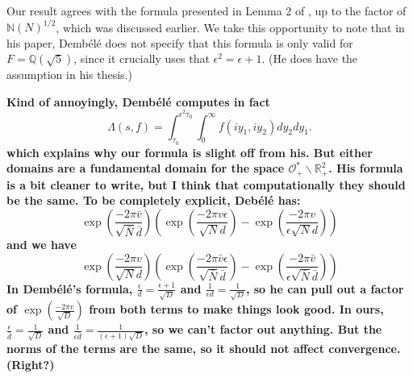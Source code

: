 \documentclass{article}
\theoremstyle{plain}
\begin{document}
Our result agrees with the formula presented in Lemma 2 of \cite{dembele}, up to the factor of $\mathbb{N}(N)^{1/2}$, which was discussed earlier. We take this opportunity to note that in his paper, Demb\'{e}l\'{e} does not specify that this formula is only valid for $F=\mathbb{Q}(\sqrt{5})$, since it crucially uses that $\epsilon^2=\epsilon+1$. (He does have the assumption in his thesis.)

\textbf{Kind of annoyingly, Demb\'{e}l\'{e} computes in fact
\begin{equation*}
\Lambda(s,f)= \int_{\tau_0}^{\epsilon^2 \tau_0}\int_{0}^{\infty} f\left(iy_1,iy_2\right)  dy_2 dy_1.
\end{equation*}
which explains why our formula is slight off from his. But either domains are a fundamental domain for the space $\mathcal{O}_+^*\backslash \mathbb{R}^2_+$. His formula is a bit cleaner to write, but I think that computationally they should be the same. To be completely explicit, Deb\'{e}l\'{e} has:
\begin{equation*}
\exp\left( \frac{-2\pi\bar{v}}{\sqrt{\bar{N}}\bar{d}}\right) \left(\exp\left(\frac{-2 \pi v \epsilon}{\sqrt{N} d}\right) - \exp \left( \frac{-2\pi v}{\epsilon \sqrt{N}d}\right) \right)
\end{equation*}
and we have
\begin{equation*}
\exp\left( \frac{-2\pi v}{\sqrt{N}d}\right) \left(\exp\left(\frac{-2 \pi \bar{v} \epsilon}{\sqrt{\bar{N}} \bar{d}}\right) - \exp \left( \frac{-2\pi \bar{v}}{\epsilon \sqrt{\bar{N}}\bar{d}}\right) \right)
\end{equation*}
In Demb\'{e}l\'{e}'s formula, $\frac{\epsilon}{d}=\frac{\epsilon+1}{\sqrt{D}}$ and $\frac{1}{\epsilon d}=\frac{1}{\sqrt{D}}$, so he can pull out a factor of $\exp\left(\frac{-2 \pi v}{\sqrt{D}}\right)$ from both terms to make things look good. In ours, $\frac{\epsilon}{\bar{d}}=\frac{1}{\sqrt{D}}$ and $\frac{1}{\epsilon \bar{d}}=\frac{1}{(\epsilon+1) \sqrt{D}}$, so we can't factor out anything. But the norms of the terms are the same, so it should not affect convergence. (Right?)}

\end{document}
